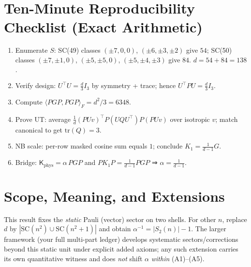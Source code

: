 \section{Ten-Minute Reproducibility Checklist (Exact Arithmetic)}
\begin{enumerate}
\item Enumerate $S$: SC(49) classes \((\pm7,0,0)\), \((\pm6,\pm3,\pm2)\) give \(54\); SC(50) classes \((\pm7,\pm1,0)\), \((\pm5,\pm5,0)\), \((\pm5,\pm4,\pm3)\) give \(84\). \(\boxed{d=54+84=138}\).
\item Verify design: \(U^\top U=\tfrac{d}{3}I_3\) by symmetry + trace; hence \(U^\top P U=\tfrac{d}{3}I_3\).
\item Compute \(\langle PGP,PGP\rangle_F=d^2/3=6348\).
\item Prove UT: average \(\frac{1}{d}(PUv)^\top P(UQU^\top)P(PUv)\) over isotropic \(v\); match canonical to get \(\mathrm{tr}(Q)=3\).
\item NB scale: per-row masked cosine sum equals \(1\); conclude \(K_1=\frac{1}{d-1}G\).
\item Bridge: \(\mathsf{K}_{\!\mathrm{phys}}=\alpha\,PGP\) and \(PK_1P=\frac{1}{d-1}PGP\) ⇒ \(\alpha=\frac{1}{d-1}\).
\end{enumerate}

\section{Scope, Meaning, and Extensions}
This result fixes the \emph{static} Pauli (vector) sector on two shells. For other \(n\), replace \(d\) by \(|\mathrm{SC}(n^2)\cup\mathrm{SC}(n^2+1)|\) and obtain \(\alpha^{-1}=|S_2(n)|-1\).
The larger framework (your full multi-part ledger) develops systematic sectors/corrections beyond this static unit under explicit added axioms; any such extension carries its own quantitative witness and does \emph{not} shift \(\alpha\) \emph{within} (A1)–(A5).

